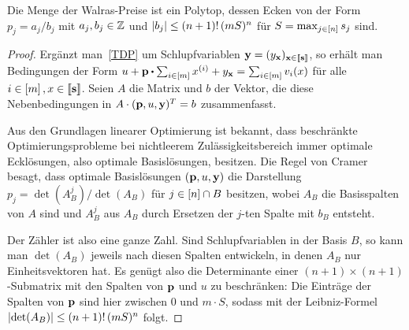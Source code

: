 \begin{lemma}
	Die Menge der Walras-Preise ist ein Polytop, dessen Ecken von der Form $p_j = a_j/b_j$ mit $a_j,b_j\in\mathbb{Z}$ und
	$\left\lvert b_j \right\rvert \leq (n+1)!\, (mS)^n$
	für $S = \max_{j\in\left[ n \right]} s_j$ sind.
\end{lemma}
\begin{proof}
	Ergänzt man~\eqref{TDP} um Schlupfvariablen $\mathbf{y}=(y_{\mathbf{x}})_{\mathbf{x}\in\left\llbracket \mathbf{s} \right\rrbracket}$, so erhält man Bedingungen der Form $ u + \fp \bcdot \sum_{i\in\first{m}} x^{(i)} + y_{\fx} = \sum_{i\in\first{m}} v_i(x) $ für alle $i\in\left[ m \right], x\in\left\llbracket \mathbf{s} \right\rrbracket$.
	Seien $A$ die Matrix und $b$ der Vektor, die diese Nebenbedingungen in $A \cdot (\mathbf{p}, u, \mathbf{y})^T = b$ zusammenfasst.
	
	
	Aus den Grundlagen linearer Optimierung ist bekannt, dass beschränkte Optimierungsprobleme bei nichtleerem Zulässigkeitsbereich immer optimale Ecklösungen, also optimale Basislösungen, besitzen.
	Die Regel von Cramer besagt, dass optimale Basislösungen $(\mathbf{p}, u, \mathbf{y})$ die Darstellung $p_j = \det(A_B^j) / \det(A_B)$ für $j\in\left[ n \right]\cap B$ besitzen, wobei $A_B$ die Basisspalten von $A$ sind und $A_B^j$ aus $A_B$ durch Ersetzen der $j$-ten Spalte mit $b_B$ entsteht.
	
	Der Zähler ist also eine ganze Zahl.
	Sind Schlupfvariablen in der Basis $B$, so kann man $\det(A_B)$ jeweils nach diesen Spalten entwickeln, in denen $A_B$ nur Einheitsvektoren hat.
	Es genügt also die Determinante einer $(n+1)\times(n+1)$-Submatrix mit den Spalten von $\mathbf{p}$ und $u$ zu beschränken:
 	Die Einträge der Spalten von $\mathbf{p}$ sind hier zwischen 0 und $m\cdot S$, sodass mit der Leibniz-Formel $\left\lvert \det(A_B) \right\rvert \leq (n+1)!\, (m S)^{n}$ folgt.
\end{proof}